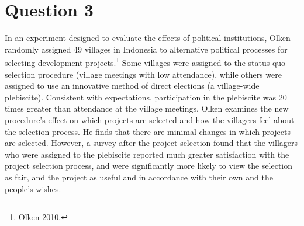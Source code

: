 \documentclass[11pt,notitlepage]{article}\usepackage[]{graphicx}\usepackage[]{color}
\begin{document}
\section*{Question 3}
In an experiment designed to evaluate the effects of political institutions, Olken randomly assigned 49 villages in Indonesia to alternative political processes for selecting development projects.\footnote{Olken 2010.} Some villages were assigned to the status quo selection procedure (village meetings with low attendance), while others were assigned to use an innovative method of direct elections (a village-wide plebiscite). Consistent with expectations, participation in the plebiscite was 20 times greater than attendance at the village meetings. Olken examines the new procedure's effect on which projects are selected and how the villagers feel about the selection process. He finds that there are minimal changes in which projects are selected. However, a survey after the project selection found that the villagers who were assigned to the plebiscite reported much greater satisfaction with the project selection process, and were significantly more likely to view the selection as fair, and the project as useful and in accordance with their own and the people's wishes.
\end{document}
